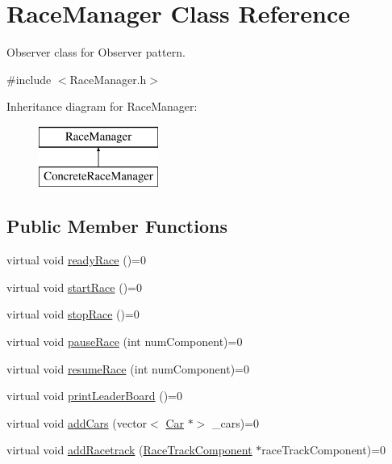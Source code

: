 \hypertarget{class_race_manager}{}\section{Race\+Manager Class Reference}
\label{class_race_manager}


Observer class for Observer pattern.  




{\ttfamily \#include $<$Race\+Manager.\+h$>$}

Inheritance diagram for Race\+Manager\+:\begin{figure}[H]
\begin{center}
\leavevmode
\includegraphics[height=2.000000cm]{class_race_manager}
\end{center}
\end{figure}
\subsection*{Public Member Functions}
\begin{DoxyCompactItemize}
\item 
virtual void \mbox{\hyperlink{class_race_manager_aadeaeec5eaf2d1d8d0178b9fe06116cb}{ready\+Race}} ()=0
\item 
virtual void \mbox{\hyperlink{class_race_manager_a174c266d650ae1da004a6b1aada152b3}{start\+Race}} ()=0
\item 
virtual void \mbox{\hyperlink{class_race_manager_a008bf389eeb0dc37dceb5f5fd0bcf9c1}{stop\+Race}} ()=0
\item 
virtual void \mbox{\hyperlink{class_race_manager_a8718e9cf2da16ba3f468ac72b2ac5cc6}{pause\+Race}} (int num\+Component)=0
\item 
virtual void \mbox{\hyperlink{class_race_manager_a3a0299ac9a07a2cdc7c1135c6bbff453}{resume\+Race}} (int num\+Component)=0
\item 
virtual void \mbox{\hyperlink{class_race_manager_a2150e315365566150ce687020adc772f}{print\+Leader\+Board}} ()=0
\item 
virtual void \mbox{\hyperlink{class_race_manager_a96b19bc745ac837db71d71e3a2925ce8}{add\+Cars}} (vector$<$ \mbox{\hyperlink{class_car}{Car}} $\ast$$>$ \+\_\+cars)=0
\item 
virtual void \mbox{\hyperlink{class_race_manager_ae6dda6855a1f976bb46c2b53ad8f29a4}{add\+Racetrack}} (\mbox{\hyperlink{class_race_track_component}{Race\+Track\+Component}} $\ast$race\+Track\+Component)=0
\end{DoxyCompactItemize}


